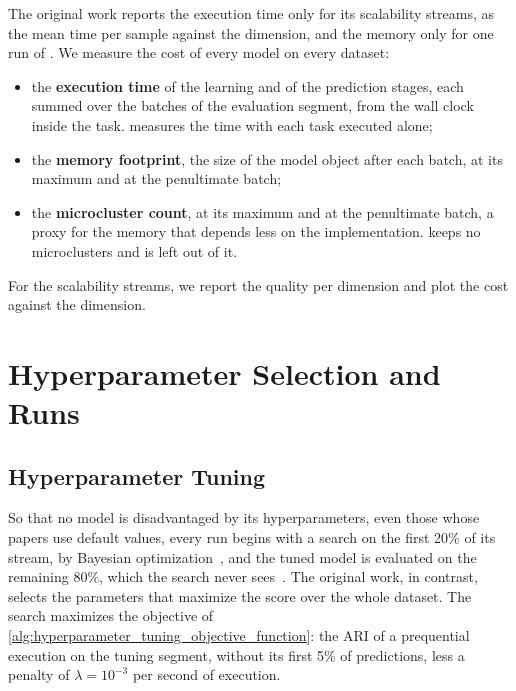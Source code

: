 The original work reports the execution time only for its scalability streams, as the mean time per sample against the dimension, and the memory only for one run of \BenchmarkOne. We measure the cost of every model on every dataset:

\begin{itemize}
    \item the \textbf{execution time} of the learning and of the prediction stages, each summed over the batches of the evaluation segment, from the wall clock inside the task.  measures the time with each task executed alone;
    \item the \textbf{memory footprint}, the size of the model object after each batch, at its maximum and at the penultimate batch;
    \item the \textbf{microcluster count}, at its maximum and at the penultimate batch, a proxy for the memory that depends less on the implementation. \StreamKM keeps no microclusters and is left out of it.
\end{itemize}

For the scalability streams, we report the quality per dimension and plot the cost against the dimension.

\section{Hyperparameter Selection and Runs}
\label{sec:tuning_and_runs}

\subsection{Hyperparameter Tuning}
\label{subsec:hyperparameter_tuning}

So that no model is disadvantaged by its hyperparameters, even those whose papers use default values, every run begins with a search on the first 20\% of its stream, by Bayesian optimization~\cite{ozaki2025optunahub}, and the tuned model is evaluated on the remaining 80\%, which the search never sees~\cite{kaufman2012leakage,kapoor2023leakage}. The original work, in contrast, selects the parameters that maximize the score over the whole dataset. The search maximizes the objective of \cref{alg:hyperparameter_tuning_objective_function}: the ARI of a prequential execution on the tuning segment, without its first 5\% of predictions, less a penalty of $\lambda = 10^{-3}$ per second of execution.

